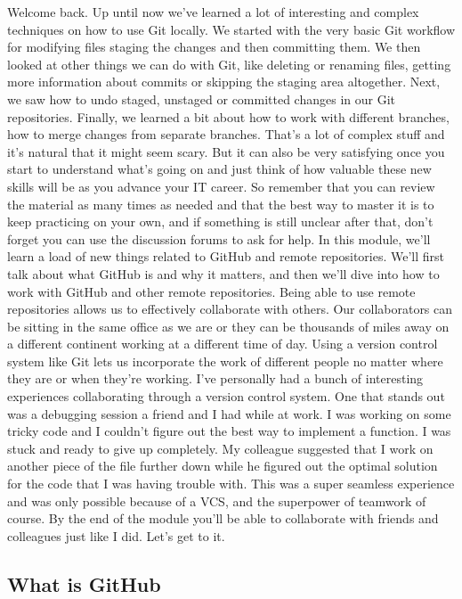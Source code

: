 Welcome back. Up until now we've learned a lot of interesting and complex techniques on how to use Git locally. We started with the very basic Git workflow for modifying files staging the changes and then committing them. We then looked at other things we can do with Git, like deleting or renaming files, getting more information about commits or skipping the staging area altogether. Next, we saw how to undo staged, unstaged or committed changes in our Git repositories. Finally, we learned a bit about how to work with different branches, how to merge changes from separate branches. That's a lot of complex stuff and it's natural that it might seem scary. But it can also be very satisfying once you start to understand what's going on and just think of how valuable these new skills will be as you advance your IT career. So remember that you can review the material as many times as needed and that the best way to master it is to keep practicing on your own, and if something is still unclear after that, don't forget you can use the discussion forums to ask for help. In this module, we'll learn a load of new things related to GitHub and remote repositories. We'll first talk about what GitHub is and why it matters, and then we'll dive into how to work with GitHub and other remote repositories. Being able to use remote repositories allows us to effectively collaborate with others. Our collaborators can be sitting in the same office as we are or they can be thousands of miles away on a different continent working at a different time of day. Using a version control system like Git lets us incorporate the work of different people no matter where they are or when they're working. I've personally had a bunch of interesting experiences collaborating through a version control system. One that stands out was a debugging session a friend and I had while at work. I was working on some tricky code and I couldn't figure out the best way to implement a function. I was stuck and ready to give up completely. My colleague suggested that I work on another piece of the file further down while he figured out the optimal solution for the code that I was having trouble with. This was a super seamless experience and was only possible because of a VCS, and the superpower of teamwork of course. By the end of the module you'll be able to collaborate with friends and colleagues just like I did. Let's get to it.

\subsection{What is GitHub} \label{W301b}

